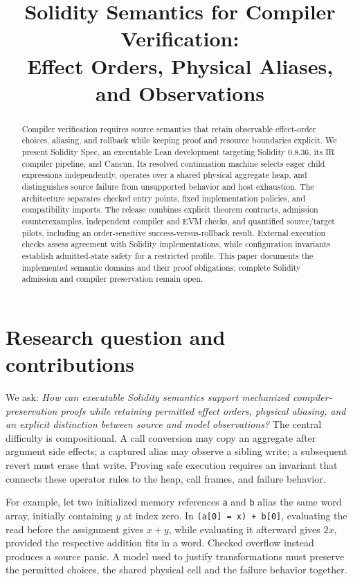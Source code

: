 \documentclass[conference]{IEEEtran}
\title{Solidity Semantics for Compiler Verification:\\Effect Orders, Physical Aliases, and Observations}
\author{\IEEEauthorblockN{OKcontract Labs}
\IEEEauthorblockA{Lean formalization for Solidity 0.8.36 and Cancun\\12 November 2026}}
\newcommand{\code}[1]{\texttt{#1}}
\begin{document}
\maketitle
\begin{abstract}
Compiler verification requires source semantics that retain observable effect-order
choices, aliasing, and rollback while keeping proof and resource boundaries
explicit. We present Solidity Spec, an executable Lean development targeting
Solidity 0.8.36, its IR compiler pipeline, and Cancun. Its resolved continuation machine selects
eager child expressions independently, operates over a shared physical aggregate
heap, and distinguishes source failure from unsupported behavior and host exhaustion.
The architecture separates checked entry points, fixed implementation policies,
and compatibility imports.
The release combines explicit theorem contracts, admission counterexamples,
independent compiler and EVM checks, and quantified source/target pilots, including
an order-sensitive success-versus-rollback result. External execution checks
assess agreement with Solidity implementations, while configuration invariants
establish admitted-state safety for a restricted profile. This paper documents
the implemented semantic domains and their proof obligations; complete Solidity
admission and compiler preservation remain open.
\end{abstract}

\section{Research question and contributions}
We ask: \emph{How can executable Solidity semantics support mechanized
compiler-preservation proofs while retaining permitted effect orders, physical
aliasing, and an explicit distinction between source and model observations?}
The central difficulty is compositional. A call conversion may copy an aggregate after
argument side effects; a captured alias may observe a sibling write; a subsequent revert
must erase that write. Proving safe execution requires an invariant that
connects these operator rules to the heap, call frames, and failure behavior.

For example, let two initialized memory references \code{a} and \code{b}
alias the same word array, initially containing $y$ at index zero. In
\code{(a[0] = x) + b[0]}, evaluating the read before the assignment gives
$x+y$, while evaluating it afterward gives $2x$, provided the respective
addition fits in a word. Checked overflow instead produces a source panic.
A model used to justify transformations must preserve the permitted choices,
the shared physical cell and the failure behavior together.
\end{document}
